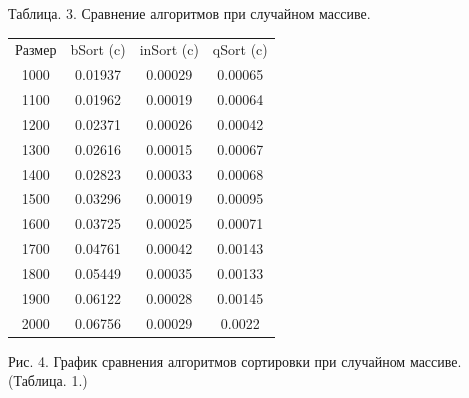 \documentclass[12pt]{report}
\begin{document}
\begin{center}
	Таблица. 3. Сравнение алгоритмов при случайном массиве.
	\begin{tabular}{|c c c c|}
		\hline
		Размер & bSort (c) & inSort (c) & qSort (c) \\ [0.5ex]
		1000 & 0.01937 & 0.00029 & 0.00065 \\ 
		\hline 
		1100 & 0.01962 & 0.00019 & 0.00064 \\ 
		\hline 
		1200 & 0.02371 & 0.00026 & 0.00042 \\ 
		\hline 
		1300 & 0.02616 & 0.00015 & 0.00067 \\ 
		\hline 
		1400 & 0.02823 & 0.00033 & 0.00068 \\ 
		\hline 
		1500 & 0.03296 & 0.00019 & 0.00095 \\ 
		\hline 
		1600 & 0.03725 & 0.00025 & 0.00071 \\ 
		\hline 
		1700 & 0.04761 & 0.00042 & 0.00143 \\ 
		\hline 
		1800 & 0.05449 & 0.00035 & 0.00133 \\ 
		\hline 
		1900 & 0.06122 & 0.00028 & 0.00145 \\ 
		\hline 
		2000 & 0.06756 & 0.00029 & 0.0022 \\ 
		\hline 
	\end{tabular}
\end{center}

\begin{center}
	\begin{center}
	\end{center}
	Рис. 4. График сравнения алгоритмов сортировки при случайном массиве. (Таблица. 1.)
\end{center}
\end{document}
